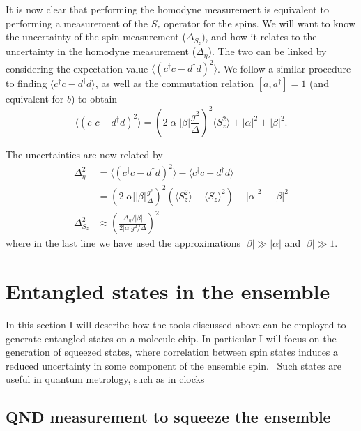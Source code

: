 It is now clear that performing the homodyne measurement is equivalent to
performing a measurement of the $S_z$ operator for the spins. We will want to
know the uncertainty of the spin measurement ($\Delta_{S_z}$), and how it
relates to the uncertainty in the homodyne measurement ($\Delta_\eta$). The two
can be linked by considering the expectation value $\langle (c^\dagger c -
d^\dagger d)^2 \rangle$.
We follow a similar procedure to finding $\langle c^\dagger c - d^\dagger d
\rangle$, as well as the commutation relation $[a,a^\dagger] = 1$ (and
equivalent for $b$) to obtain
%
\begin{equation}
  \langle (c^\dagger c - d^\dagger d)^2 \rangle = (2|\alpha||\beta|
  \frac{g^2}{\Delta})^2\langle S_z^2\rangle + |\alpha|^2+|\beta|^2.
\end{equation}

The uncertainties are now related by
%
\begin{align}
  \Delta_\eta^2 &= \langle (c^\dagger c - d^\dagger d)^2 \rangle - \langle
  c^\dagger c - d^\dagger d\rangle \\
  &= (2|\alpha||\beta| \frac{g^2}{\Delta})^2(\langle S_z^2\rangle - \langle
  S_z\rangle^2) - |\alpha|^2 - |\beta|^2 \\
  \Delta_{S_z}^2 &\approx
  \left(\frac{\Delta_\eta/|\beta|}{2|\alpha|g^2/\Delta}\right)^2
  \label{squeeze:eqn:homouncert}
\end{align}
%
where in the last line we have used the approximations $|\beta| \gg |\alpha|$
and $|\beta|\gg 1$.

\section{Entangled states in the ensemble}

In this section I will describe how the tools discussed above can be employed
to generate entangled states on a molecule chip. In particular I will focus on
the generation of squeezed states, where correlation between spin states
induces a reduced uncertainty in some component of the ensemble spin.~\cite{}
Such states are useful in quantum metrology, such as in clocks~\cite{} 


\subsection{QND measurement to squeeze the ensemble}
\label{squeeze:QNDsqueeze}


